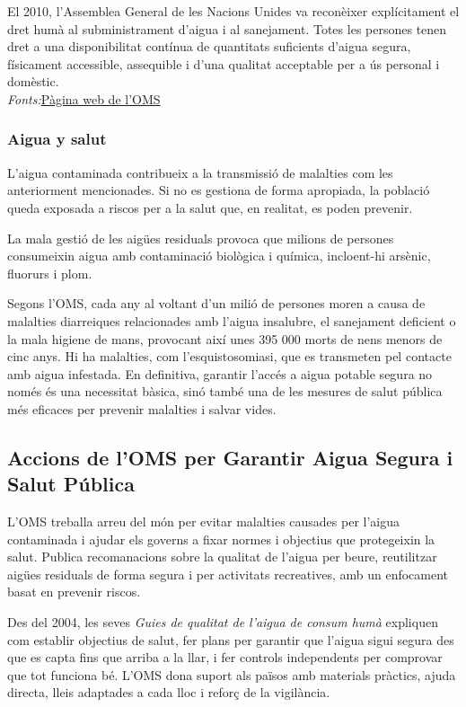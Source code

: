 El 2010, l'Assemblea General de les Nacions Unides va reconèixer explícitament el dret humà al subministrament d'aigua i al sanejament. Totes les persones tenen dret a una disponibilitat contínua de quantitats suficients d'aigua segura, físicament accessible, assequible i d'una qualitat acceptable per a ús personal i domèstic.\\
\textit{Fonts:}\href{https://https://www.who.int/es/news-room/fact-sheets/detail/drinking-water}{Pàgina web de l'OMS}

\subsubsection{Aigua y salut}
L’aigua contaminada contribueix a la transmissió de malalties com les anteriorment mencionades. Si no es gestiona de forma apropiada, la població queda exposada a riscos per a la salut que, en realitat, es poden prevenir.

La mala gestió de les aigües residuals provoca que milions de persones consumeixin aigua amb contaminació biològica i química, incloent-hi arsènic, fluorurs i plom.

Segons l’OMS, cada any al voltant d’un milió de persones moren a causa de malalties diarreiques relacionades amb l’aigua insalubre, el sanejament deficient o la mala higiene de mans, provocant així unes 395 000 morts de nens menors de cinc anys. Hi ha malalties, com l’esquistosomiasi, que es transmeten pel contacte amb aigua infestada.
En definitiva, garantir l’accés a aigua potable segura no només és una necessitat bàsica, sinó també una de les mesures de salut pública més eficaces per prevenir malalties i salvar vides.

\subsection{Accions de l’OMS per Garantir Aigua Segura i Salut Pública}
L’OMS treballa arreu del món per evitar malalties causades per l’aigua contaminada i ajudar els governs a fixar normes i objectius que protegeixin la salut. Publica recomanacions sobre la qualitat de l’aigua per beure, reutilitzar aigües residuals de forma segura i per activitats recreatives, amb un enfocament basat en prevenir riscos.

Des del 2004, les seves \textit{Guies de qualitat de l’aigua de consum humà} expliquen com establir objectius de salut, fer plans per garantir que l’aigua sigui segura des que es capta fins que arriba a la llar, i fer controls independents per comprovar que tot funciona bé. L’OMS dona suport als països amb materials pràctics, ajuda directa, lleis adaptades a cada lloc i reforç de la vigilància.

